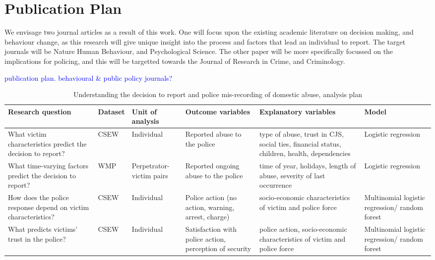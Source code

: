 \documentclass[11pt, a4paper]{article}
\newcommand{\AT}[1] {{\textcolor{blue}{#1}}}
\begin{document}
\section{Publication Plan}

We envisage two journal articles as a result of this work. One will focus upon the existing academic literature on decision making, and behaviour change, as this research will give unique insight into the process and factors that lead an individual to report. The target journals will be Nature Human Behaviour, and Psychological Science. The other paper will be more specifically focussed on the implications for policing, and this will be targetted towards the Journal of Research in Crime, and Criminology.

\AT{publication plan. behavioural \& public policy journals?}



\begin{table}[!htbp]
\caption{Understanding the decision to report and police mis-recording of domestic abuse, analysis plan}
  \begin{threeparttable}[t]
  \centering
       \begin{tabular}{ L{3cm}  C{1.1cm}  C{1.5cm}  C{3cm}  C{3.3cm}  C{2.8cm} }
    \toprule
     \textbf{Research question} & \textbf{Dataset}    & \textbf{Unit of analysis} & \textbf{Outcome variables} & \textbf{Explanatory variables} & \textbf{Model} \\
                \midrule
     What victim characteristics predict the decision to report? & CSEW & Individual  & Reported abuse to the police & type of abuse, trust in CJS, social ties, financial status, children, health, dependencies & Logistic regression \\
       \midrule
          What time-varying factors predict the decision to report? & WMP & Perpetrator-victim pairs & Reported ongoing abuse to the police & time of year, holidays, length of abuse, severity of last occurrence & Logistic regression \\                    
                     \midrule
    How does the police response depend on victim characteristics? & CSEW  & Individual & Police action (no action, warning, arrest, charge) &  socio-economic characteristics of victim and police force  & Multinomial logistic regression/ random forest \\
     \midrule
    What predicts victims' trust in the police? & CSEW  & Individual & Satisfaction with police action, perception of security & police action,  socio-economic characteristics of victim and police force & Multinomial logistic regression/ random forest \\
     \bottomrule
  \end{tabular}
    \end{threeparttable}%
  \label{tab:addlabel}%
\end{table}%
\end{document}
